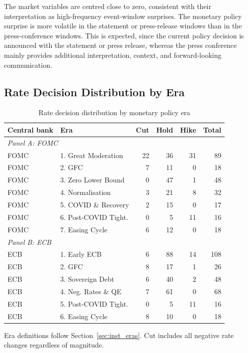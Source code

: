 The market variables are centred close to zero, consistent with their
interpretation as high-frequency event-window surprises. The monetary
policy surprise is more volatile in the statement or press-release
windows than in the press-conference windows. This is expected, since the
current policy decision is announced with the statement or press release,
whereas the press conference mainly provides additional interpretation,
context, and forward-looking communication.

\subsection{Rate Decision Distribution by Era}
\label{sec:data_desc_rates}

\begin{table}[htbp]
\centering
\caption{Rate decision distribution by monetary policy era}
\label{tab:rate_by_era}
\begin{threeparttable}
\small
\begin{tabular}{llrrrr}
\toprule
Central bank & Era & Cut & Hold & Hike & Total \\
\midrule
\multicolumn{6}{l}{\textit{Panel A: FOMC}} \\
FOMC & 1. Great Moderation     & 22 & 36 & 31 & 89 \\
FOMC & 2. GFC                  & 7  & 11 & 0  & 18 \\
FOMC & 3. Zero Lower Bound     & 0  & 47 & 1  & 48 \\
FOMC & 4. Normalisation        & 3  & 21 & 8  & 32 \\
FOMC & 5. COVID \& Recovery    & 2  & 15 & 0  & 17 \\
FOMC & 6. Post-COVID Tight.    & 0  & 5  & 11 & 16 \\
FOMC & 7. Easing Cycle         & 6  & 12 & 0  & 18 \\
\midrule
\multicolumn{6}{l}{\textit{Panel B: ECB}} \\
ECB  & 1. Early ECB            & 6  & 88 & 14 & 108 \\
ECB  & 2. GFC                  & 8  & 17 & 1  & 26 \\
ECB  & 3. Sovereign Debt       & 6  & 40 & 2  & 48 \\
ECB  & 4. Neg. Rates \& QE     & 7  & 61 & 0  & 68 \\
ECB  & 5. Post-COVID Tight.    & 0  & 5  & 11 & 16 \\
ECB  & 6. Easing Cycle         & 8  & 10 & 0  & 18 \\
\bottomrule
\end{tabular}
\begin{tablenotes}\footnotesize
  \item[] Era definitions follow Section~\ref{sec:inst_eras}. Cut includes all
  negative rate changes regardless of magnitude.
\end{tablenotes}
\end{threeparttable}
\end{table}

